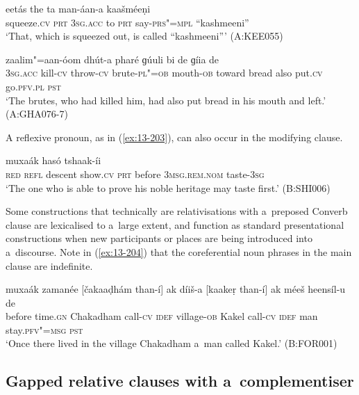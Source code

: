 \begin{exe}
\ex
\label{ex:13-201}
\gll [preeṣaá ba] eetás the ta man-áan-a  kaašméeṇi \\
squeeze.\textsc{cv} \textsc{prt} \textsc{3sg.acc} to \textsc{prt} say-\textsc{prs"=mpl}  ``kashmeeni'' \\
\glt `That, which is squeezed out, is called ``kashmeeni''' (A:KEE055)

\ex
\label{ex:13-202}
 zaalim"=aan-óom dhút-a  pharé ɡúuli bi de ɡíia de \\
\textsc{3sg.acc} kill-\textsc{cv} throw-\textsc{cv} brute-\textsc{pl"=ob} mouth-\textsc{ob}  toward bread also put.\textsc{cv} go.\textsc{pfv.pl} \textsc{pst} \\
\glt `The brutes, who had killed him, had also put bread in his mouth and left.' (A:GHA076-7) 
\end{exe}

A reflexive pronoun, as in (\ref{ex:13-203}), can also occur in the modifying clause. 

\begin{exe}
\ex
\label{ex:13-203}
 muxaák hasó  tshaak-íi \\
\textsc{red} \textsc{refl} descent show.\textsc{cv} \textsc{prt} before \textsc{3msg.rem.nom}  taste-\textsc{3sg} \\
\glt `The one who is able to prove his noble heritage may taste first.' (B:SHI006) 
\end{exe}

Some constructions that technically are relativisations with a~preposed Converb clause are lexicalised to a~large extent, and function as standard presentational constructions when new participants or places are being introduced into a~discourse. Note in (\ref{ex:13-204}) that the coreferential noun phrases in the main clause are indefinite.

\begin{exe}
\ex
\label{ex:13-204}
\gll muxaák zamanée [čakaaḍhám than-í] ak díiš-a  [kaakeṛ than-í] ak méeš heensíl-u de  \\
before time.\textsc{gn} Chakadham call-\textsc{cv} \textsc{idef} village-\textsc{ob}  Kakel call-\textsc{cv} \textsc{idef} man stay.\textsc{pfv"=msg} \textsc{pst} \\
\glt `Once there lived in the village Chakadham a~man called Kakel.' (B:FOR001)
\end{exe}

\subsection{Gapped relative clauses with a~complementiser}
\label{subsec:13-6-4}


